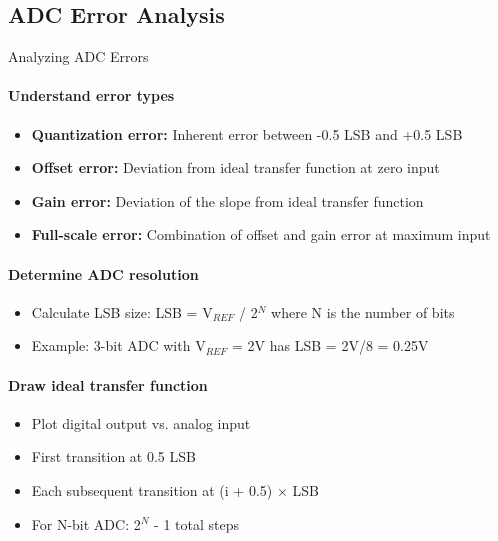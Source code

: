 \subsection{ADC Error Analysis}

\begin{KR}{Analyzing ADC Errors}
\paragraph{Understand error types}
\begin{itemize}
    \item \textbf{Quantization error:} Inherent error between -0.5 LSB and +0.5 LSB
    \item \textbf{Offset error:} Deviation from ideal transfer function at zero input
    \item \textbf{Gain error:} Deviation of the slope from ideal transfer function
    \item \textbf{Full-scale error:} Combination of offset and gain error at maximum input
\end{itemize}

\paragraph{Determine ADC resolution}
\begin{itemize}
    \item Calculate LSB size: LSB = V$_{REF}$ / 2$^N$ where N is the number of bits
    \item Example: 3-bit ADC with V$_{REF}$ = 2V has LSB = 2V/8 = 0.25V
\end{itemize}

\paragraph{Draw ideal transfer function}
\begin{itemize}
    \item Plot digital output vs. analog input
    \item First transition at 0.5 LSB
    \item Each subsequent transition at (i + 0.5) × LSB
    \item For N-bit ADC: 2$^N$ - 1 total steps
\end{itemize}


\end{KR}
